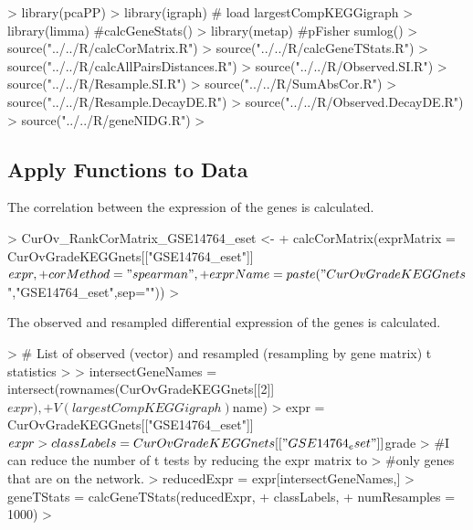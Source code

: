 \documentclass[11pt]{article}
\begin{document}
\begin{Schunk}
\begin{Sinput}
> library(pcaPP)
> library(igraph) # load largestCompKEGGigraph
> library(limma) #calcGeneStats()
> library(metap) #pFisher sumlog()
> source("../../R/calcCorMatrix.R")
> source("../../R/calcGeneTStats.R")
> source("../../R/calcAllPairsDistances.R")
> source("../../R/Observed.SI.R")
> source("../../R/Resample.SI.R")
> source("../../R/SumAbsCor.R")
> source("../../R/Resample.DecayDE.R")
> source("../../R/Observed.DecayDE.R")
> source("../../R/geneNIDG.R")
> 
\end{Sinput}
\end{Schunk}




\subsection*{Apply Functions to Data} %



The correlation between the expression of the genes is calculated.


\begin{Schunk}
\begin{Sinput}
> CurOv_RankCorMatrix_GSE14764_eset <- 
+ calcCorMatrix(exprMatrix = CurOvGradeKEGGnets[["GSE14764_eset"]]$expr,
+ 			  corMethod = "spearman",
+ 			  exprName = paste("CurOvGradeKEGGnets$","GSE14764_eset",sep=""))
> 
\end{Sinput}
\end{Schunk}



The observed and resampled differential expression of the genes is calculated. 

\begin{Schunk}
\begin{Sinput}
> # List of observed (vector) and resampled (resampling by gene matrix) t statistics
> 
> intersectGeneNames = intersect(rownames(CurOvGradeKEGGnets[[2]]$expr),
+ 							   V(largestCompKEGGigraph)$name)
> expr = CurOvGradeKEGGnets[["GSE14764_eset"]]$expr
> classLabels = CurOvGradeKEGGnets[["GSE14764_eset"]]$grade
> #I can reduce the number of t tests by reducing the expr matrix to 
> #only genes that are on the network.
> reducedExpr = expr[intersectGeneNames,]
> geneTStats = calcGeneTStats(reducedExpr,
+ 							classLabels,
+ 							numResamples = 1000)
> 
\end{Sinput}
\end{Schunk}
\end{document}
